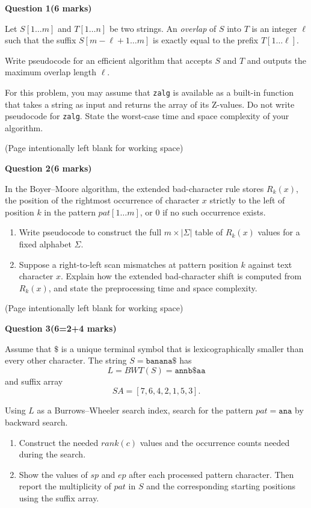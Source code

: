 \documentclass[12pt,letterpaper]{article}
\newcommand{\marksbox}[1]{%
  \vfill
  \begin{flushright}
    \fbox{\parbox[c][1.1cm][c]{1.3cm}{\centering #1}}
  \end{flushright}
}
\newcommand{\questiontitle}[2]{%
  \textbf{Question #1}\hfill\textbf{(#2 marks)}
}
\newcommand{\workingpage}{%
  \newpage
  \begin{center}
    (Page intentionally left blank for working space)
  \end{center}
}
\begin{document}
\newpage

\questiontitle{1}{6}

Let $S[1 \ldots m]$ and $T[1 \ldots n]$ be two strings. An \emph{overlap} of
$S$ into $T$ is an integer $\ell$ such that the suffix
$S[m-\ell+1 \ldots m]$ is exactly equal to the prefix $T[1 \ldots \ell]$.

Write pseudocode for an efficient algorithm that accepts $S$ and $T$ and
outputs the maximum overlap length $\ell$.

For this problem, you may assume that \texttt{zalg} is available as a built-in
function that takes a string as input and returns the array of its Z-values. Do
not write pseudocode for \texttt{zalg}. State the worst-case time and space
complexity of your algorithm.

\marksbox{6}

\workingpage
\newpage

\questiontitle{2}{6}

In the Boyer--Moore algorithm, the extended bad-character rule stores
$R_k(x)$, the position of the rightmost occurrence of character $x$ strictly to
the left of position $k$ in the pattern $pat[1 \ldots m]$, or $0$ if no such
occurrence exists.

\begin{enumerate}
  \item[(i)] Write pseudocode to construct the full $m \times |\Sigma|$ table
  of $R_k(x)$ values for a fixed alphabet $\Sigma$.

  \item[(ii)] Suppose a right-to-left scan mismatches at pattern position $k$
  against text character $x$. Explain how the extended bad-character shift is
  computed from $R_k(x)$, and state the preprocessing time and space
  complexity.
\end{enumerate}

\marksbox{6}

\workingpage
\newpage

\questiontitle{3}{6=2+4}

Assume that $\$$ is a unique terminal symbol that is lexicographically smaller
than every other character. The string $S=\texttt{banana\$}$ has
\[
  L = BWT(S)=\texttt{annb\$aa}
\]
and suffix array
\[
  SA = [7,6,4,2,1,5,3].
\]

Using $L$ as a Burrows--Wheeler search index, search for the pattern
$pat=\texttt{ana}$ by backward search.

\begin{enumerate}
  \item[(i)] Construct the needed $rank(c)$ values and the occurrence counts
  needed during the search.

  \item[(ii)] Show the values of $sp$ and $ep$ after each processed pattern
  character. Then report the multiplicity of $pat$ in $S$ and the corresponding
  starting positions using the suffix array.
\end{enumerate}
\end{document}
